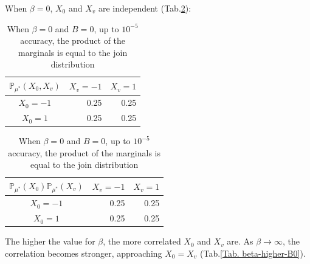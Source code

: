 \documentclass[12pt]{article}
\begin{document}
When $\beta=0$, $X_0$ and $X_v$ are independent (Tab.\ref{Tab. beta0B0}):
\begin{table}[h]
    \centering
    \begin{tabular}{c|rr}
        $\mathbb{P}_{\mu^*}(X_0, X_v)$ & \multicolumn{1}{c}{$X_v=-1$} & \multicolumn{1}{c}{$X_v=1$} \\ \hline
        $X_0=-1$                       & 0.25                         & 0.25                        \\
        $X_0=1$                        & 0.25                         & 0.25
    \end{tabular}
    \quad\quad
    \begin{tabular}{c|rr}
        $\mathbb{P}_{\mu^*}(X_0)\mathbb{P}_{\mu^*}(X_v)$ & \multicolumn{1}{c}{$X_v=-1$} & \multicolumn{1}{c}{$X_v=1$} \\ \hline
        $X_0=-1$                                         & 0.25                         & 0.25                        \\
        $X_0=1$                                          & 0.25                         & 0.25
    \end{tabular}
    \caption{When $\beta=0$ and $B=0$, up to $10^{-5}$ accuracy, the product of the marginals is equal to the join distribution}
    \label{Tab. beta0B0}
\end{table}

\noindent The higher the value for $\beta$, the more correlated $X_0$ and $X_v$ are. As $\beta\rightarrow\infty$, the correlation becomes stronger,
approaching $X_0=X_v$ (Tab.\ref{Tab. beta-higher-B0}).
\end{document}
